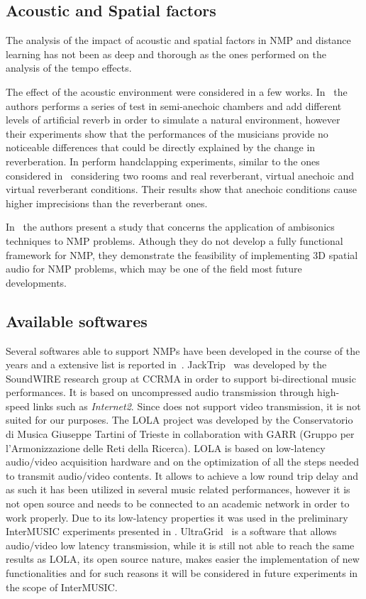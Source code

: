 \subsection{Acoustic and Spatial factors}\label{subsec:acoustics}
The analysis of the impact of acoustic and spatial factors in NMP and distance learning has not been as deep and thorough as the ones performed on the analysis of the tempo effects. 

The effect of the acoustic environment were considered in a few works. In~\cite{carot2009towards} the authors performs a series of test in semi-anechoic chambers and add different levels of artificial reverb in order to simulate a natural environment, however their experiments show that the performances of the musicians provide no noticeable differences that could be directly explained by the change in reverberation. In \cite{FarnerReverb} perform handclapping experiments, similar to the ones considered in~\cite{Chafe1} considering two rooms and real reverberant, virtual anechoic and virtual reverberant conditions. Their results show that anechoic conditions cause higher imprecisions than the reverberant ones.



In~\cite{gurevich2011ambisonic} the authors present a study that concerns the application of ambisonics techniques to NMP problems. Athough they do not develop a fully functional framework for NMP, they demonstrate the feasibility of implementing 3D spatial audio for NMP problems, which may be one of the field most future developments.


\subsection{Available softwares}\label{subsec:sw}
Several softwares able to support NMPs have been developed in the course of the years and a extensive list is reported in~\cite{RottondiOverview}.
JackTrip~\cite{CaceresJacktrip} was developed by the SoundWIRE research group at CCRMA in order to support bi-directional music performances. It is based on uncompressed audio transmission through high-speed links such as \textit{Internet2}. Since does not support video transmission, it is not suited for our purposes.
The LOLA\cite{drioli2013networked} project was developed by the Conservatorio di Musica Giuseppe Tartini of Trieste in collaboration with GARR (Gruppo per l'Armonizzazione delle Reti della Ricerca). LOLA is based on low-latency audio/video acquisition hardware and on the optimization of all the steps needed to transmit audio/video contents. It allows to achieve a low round trip delay and as such it has been utilized in several music related performances, however it is not open source and needs to be connected to an academic network in order to work properly. Due to its low-latency properties it was used in the preliminary InterMUSIC experiments presented in \cite{CIM2018}. 
UltraGrid~\cite{holub2006high} is a software that allows audio/video low latency transmission, while it is still not able to reach the same results as LOLA, its open source nature, makes easier the implementation of new functionalities and for such reasons it will be considered in future experiments in the scope of InterMUSIC.
